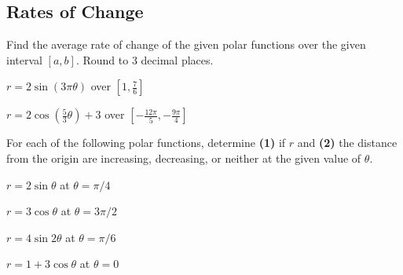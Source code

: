 \documentclass{exam}
\begin{document}
\newpage


\subsection*{Rates of Change}
Find the average rate of change of the given polar functions over the given interval $[a,b]$. Round to 3 decimal places.

\begin{questions}
    \begin{minipage}{.45\linewidth}
        \question $\displaystyle r=2\sin(3\pi\theta)$ over $\displaystyle \left[1,\frac{7}{6}\right]$    
    \end{minipage}
    \hfill
    \begin{minipage}{.45\linewidth}
        \question $\displaystyle r=2\cos\left(\frac{5}{3}\theta\right)+3$ over $\displaystyle \left[-\frac{12\pi}{5},-\frac{9\pi}{4}\right]$    
    \end{minipage}


    
\end{questions}

\noindent For each of the following polar functions, determine \textbf{(1)} if $r$ and \textbf{(2)} the distance from the origin are increasing, decreasing, or neither at the given value of $\theta$.

\begin{questions}
    \begin{minipage}{.45\linewidth}
        \question $r=2\sin\theta$ at $\theta=\pi/4$    
    \end{minipage}
    \hfill
    \begin{minipage}{.45\linewidth}
        \question $r=3\cos\theta$ at $\theta=3\pi/2$    
    \end{minipage}


    \begin{minipage}{.45\linewidth}
        \question $r=4\sin2\theta$ at $\theta=\pi/6$    
    \end{minipage}
    \hfill
    \begin{minipage}{.45\linewidth}
        \question $r=1+3\cos\theta$ at $\theta=0$    
    \end{minipage}

\end{questions}

    


\end{document}
